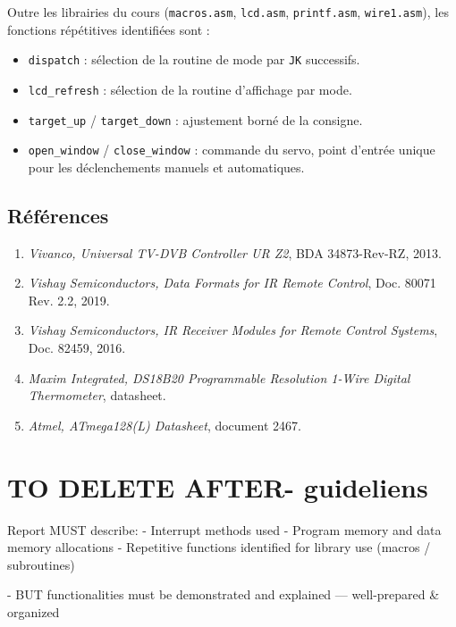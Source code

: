 \documentclass[11pt]{article}
\begin{document}
Outre les librairies du cours (\texttt{macros.asm}, \texttt{lcd.asm}, \texttt{printf.asm}, \texttt{wire1.asm}), les fonctions répétitives identifiées sont :

\begin{itemize}
  \item \texttt{dispatch} : sélection de la routine de mode par \texttt{JK} successifs.
  \item \texttt{lcd\_refresh} : sélection de la routine d'affichage par mode.
  \item \texttt{target\_up} / \texttt{target\_down} : ajustement borné de la consigne.
  \item \texttt{open\_window} / \texttt{close\_window} : commande du servo, point d'entrée unique pour les déclenchements manuels et automatiques.
\end{itemize}

\subsection*{Références}

\begin{enumerate}
  \item \textit{Vivanco, Universal TV-DVB Controller UR Z2}, BDA 34873-Rev-RZ, 2013.
  \item \textit{Vishay Semiconductors, Data Formats for IR Remote Control}, Doc. 80071 Rev. 2.2, 2019.
  \item \textit{Vishay Semiconductors, IR Receiver Modules for Remote Control Systems}, Doc. 82459, 2016.
  \item \textit{Maxim Integrated, DS18B20 Programmable Resolution 1-Wire Digital Thermometer}, datasheet.
  \item \textit{Atmel, ATmega128(L) Datasheet}, document 2467.
\end{enumerate}

\newpage{ }
\newpage{ }




\section*{TO DELETE AFTER- guideliens }

  Report MUST describe:
  - Interrupt methods used
  - Program memory and data memory allocations
  - Repetitive functions identified for library use
  (macros / subroutines)

    - BUT functionalities must be demonstrated and
  explained — well-prepared & organized
\end{document}
